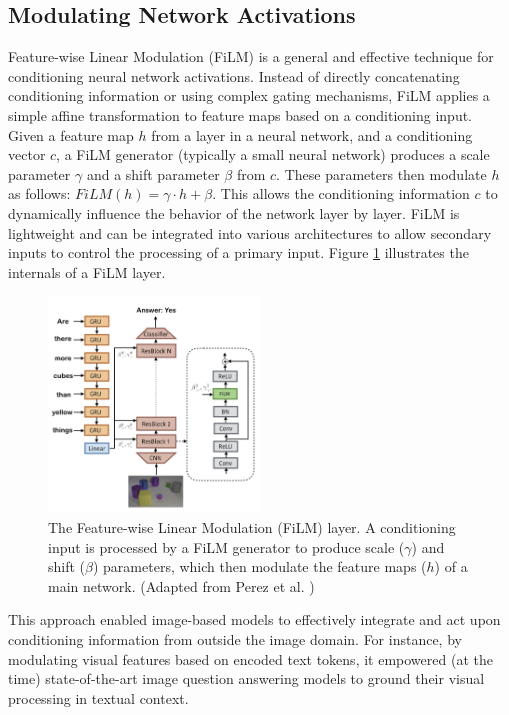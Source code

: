 \subsection{Modulating Network Activations}
Feature-wise Linear Modulation (FiLM) \cite{film} is a general and effective technique for conditioning neural network activations. Instead of directly concatenating conditioning information or using complex gating mechanisms, FiLM applies a simple affine transformation to feature maps based on a conditioning input. Given a feature map $h$ from a layer in a neural network, and a conditioning vector $c$, a FiLM generator (typically a small neural network) produces a scale parameter $\gamma$ and a shift parameter $\beta$ from $c$. These parameters then modulate $h$ as follows: $FiLM(h) = \gamma \cdot h + \beta$. This allows the conditioning information $c$ to dynamically influence the behavior of the network layer by layer. FiLM is lightweight and can be integrated into various architectures to allow secondary inputs to control the processing of a primary input. Figure \ref{fig:film-layer} illustrates the internals of a FiLM layer.

\begin{figure}[h]
  \centering
  \includegraphics[width=0.5\textwidth]{images/related-work/film.png}
  \caption{The Feature-wise Linear Modulation (FiLM) layer. A conditioning input is processed by a FiLM generator to produce scale ($\gamma$) and shift ($\beta$) parameters, which then modulate the feature maps ($h$) of a main network. (Adapted from Perez et al. \cite{film})}
  \label{fig:film-layer}
\end{figure}

This approach enabled image-based models to effectively integrate and act upon conditioning information from outside the image domain. For instance, by modulating visual features based on encoded text tokens, it empowered (at the time) state-of-the-art image question answering models to ground their visual processing in textual context.

